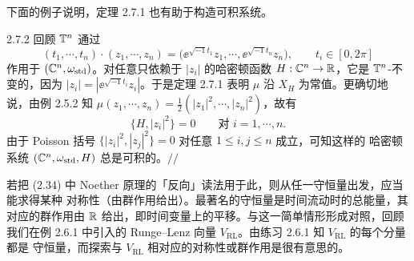 下面的例子说明，定理 2.7.1 也有助于构造可积系统。

\begin{wexam}{2.7.2}
回顾 $\mathbb{T}^n$ 通过
\[
  (t_1,\cdots,t_n)\cdot(z_1,\cdots,z_n)
  =\big(\ee^{\sqrt{-1}t_1}z_1,\cdots,\ee^{\sqrt{-1}t_n}z_n\big),
  \qquad t_i\in[0,2\pi]
\]
作用于 $(\mathbb{C}^n,\omega_{\mathrm{std}})$。对任意只依赖于 $|z_i|$ 的哈密顿函数
$H:\mathbb{C}^n\to\mathbb{R}$，它是 $\mathbb{T}^n$-不变的，因为 $|z_i|=|\ee^{\sqrt{-1}t_i}z_i|$。于是定理 2.7.1
表明 $\mu$ 沿 $X_H$ 为常值。更确切地说，由例 2.5.2 知
$\mu(z_1,\cdots,z_n)=\frac12(|z_1|^2,\cdots,|z_n|^2)$，故有
\[
  \{H,|z_i|^2\}=0\qquad\text{对 } i=1,\cdots,n .
\]
由于 Poisson 括号 $\{|z_i|^2,|z_j|^2\}=0$ 对任意 $1\le i,j\le n$ 成立，可知这样的
哈密顿系统 $(\mathbb{C}^n,\omega_{\mathrm{std}},H)$ 总是可积的。\hfill$//$
\end{wexam}

若把 (2.34) 中 Noether 原理的「反向」读法用于此，则从任一守恒量出发，应当能求得某种
对称性（由群作用给出）。最著名的守恒量是时间流动时的总能量，其对应的群作用由 $\mathbb{R}$
给出，即时间变量上的平移。与这一简单情形形成对照，回顾我们在例 2.6.1 中引入的
Runge--Lenz 向量 $V_{\mathrm{RL}}$。由练习 2.6.1 知 $V_{\mathrm{RL}}$ 的每个分量都是
守恒量，而探索与 $V_{\mathrm{RL}}$ 相对应的对称性或群作用是很有意思的。
